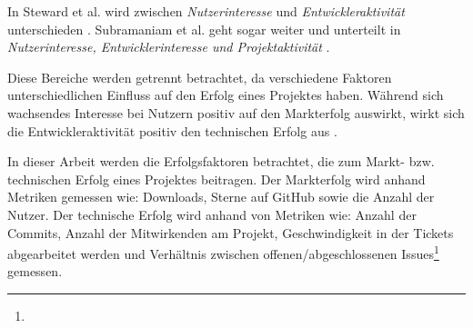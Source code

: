 In Steward et al. wird zwischen \textit{Nutzerinteresse} und \textit{Entwickleraktivität} unterschieden
\cite{stewartImpactsLicenseChoice2006a}. %
Subramaniam et al. geht sogar weiter und unterteilt in \textit{Nutzerinteresse, Entwicklerinteresse und Projektaktivität}
\cite{subramaniamDeterminantsOpenSource2009}. %

Diese Bereiche werden getrennt betrachtet, da verschiedene Faktoren unterschiedlichen Einfluss
auf den Erfolg eines Projektes haben.
Während sich wachsendes Interesse bei Nutzern positiv auf den Markterfolg auswirkt,
wirkt sich die Entwickleraktivität positiv den technischen Erfolg aus
\cite{midhaFactorsAffectingSuccess2012, %
    stewartImpactsLicenseChoice2006a}. %


In dieser Arbeit werden die Erfolgsfaktoren betrachtet, die zum Markt- bzw. technischen Erfolg
eines Projektes beitragen.
Der Markterfolg wird anhand Metriken gemessen wie:
Downloads, Sterne auf GitHub sowie die Anzahl der Nutzer.
Der technische Erfolg wird anhand von Metriken wie:
Anzahl der Commits, Anzahl der Mitwirkenden am Projekt,
Geschwindigkeit in der Tickets abgearbeitet werden und Verhältnis zwischen offenen/abgeschlossenen
Issues\footnote{} gemessen.





